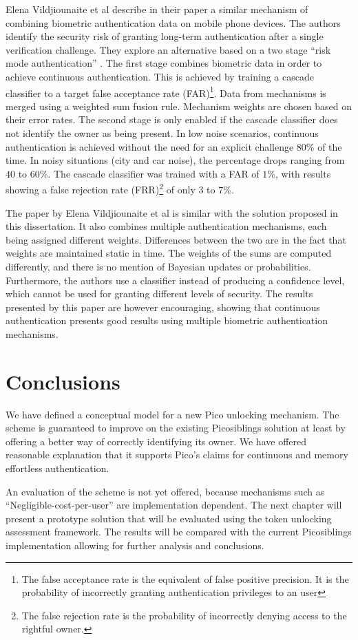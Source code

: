 Elena Vildjiounaite et al describe in their paper \cite{vildjiounaite2007increasing} a similar mechanism of combining biometric authentication data on mobile phone devices. The authors identify the security risk of granting long-term authentication after a single verification challenge. They explore an alternative based on a two stage ``risk mode authentication'' \cite{williamson2006enhanced}. The first stage combines biometric data in order to achieve continuous authentication. This is achieved by training a cascade classifier to a target false acceptance rate (FAR)\footnote{The false acceptance rate is the equivalent of false positive precision. It is the probability of incorrectly granting authentication privileges to an user}. Data from mechanisms is merged using a weighted sum fusion rule. Mechanism weights are chosen based on their error rates. The second stage is only enabled if the cascade classifier does not identify the owner as being present. In low noise scenarios, continuous authentication is achieved without the need for an explicit challenge $80\%$ of the time. In noisy situations (city and car noise), the percentage drops ranging from $40$ to $60\%$. The cascade classifier was trained with a FAR of $1\%$, with results showing a false rejection rate (FRR)\footnote{The false rejection rate is the probability of incorrectly denying access to the rightful owner.} of only $3$ to $7\%$.

The paper by Elena Vildjiounaite et al \cite{vildjiounaite2007increasing} is similar with the solution proposed in this dissertation. It also combines multiple authentication mechanisms, each being assigned different weights. Differences between the two are in the fact that weights are maintained static in time. The weights of the sums are computed differently, and there is no mention of Bayesian updates or probabilities. Furthermore, the authors use a classifier instead of producing a confidence level, which cannot be used for granting different levels of security. The results presented by this paper are however encouraging, showing that continuous authentication presents good results using multiple biometric authentication mechanisms.

\section{Conclusions}
We have defined a conceptual model for a new Pico unlocking mechanism. The scheme is guaranteed to improve on the existing Picosiblings solution at least by offering a better way of correctly identifying its owner. We have offered reasonable explanation that it supports Pico's claims for continuous and memory effortless authentication. 

An evaluation of the scheme is not yet offered, because mechanisms such as ``Negligible-cost-per-user'' are implementation dependent. The next chapter will present a prototype solution that will be evaluated using the token unlocking assessment framework. The results will be compared with the current Picosiblings implementation allowing for further analysis and conclusions.



